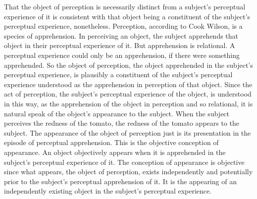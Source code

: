 \documentclass[12pt]{article}
\begin{document}
That the object of perception is necessarily distinct from a subject's perceptual experience of it is consistent with that object being a constituent of the subject's perceptual experience, nonetheless. Perception, according to Cook Wilson, is a species of apprehension. In perceiving an object, the subject apprehends that object in their perceptual experience of it. But apprehension is relational. A perceptual experience could only be an apprehension, if there were something apprehended. So the object of perception, the object apprehended in the subject's perceptual experience, is plausibly a constituent of the subject's perceptual experience understood as the apprehension in perception of that object. Since the act of perception, the subject's perceptual experience of the object, is understood in this way, as the apprehension of the object in perception and so relational, it is natural speak of the object's appearance to the subject. When the subject perceives the redness of the tomato, the redness of the tomato appears to the subject. The appearance of the object of perception just is its presentation in the episode of perceptual apprehension. This is the objective conception of appearance. An object objectively appears when it is apprehended in the subject's perceptual experience of it. The conception of appearance is objective since what appears, the object of perception, exists independently and potentially prior to the subject's perceptual apprehension of it. It is the appearing of an independently existing object in the subject's perceptual experience.
\end{document}

